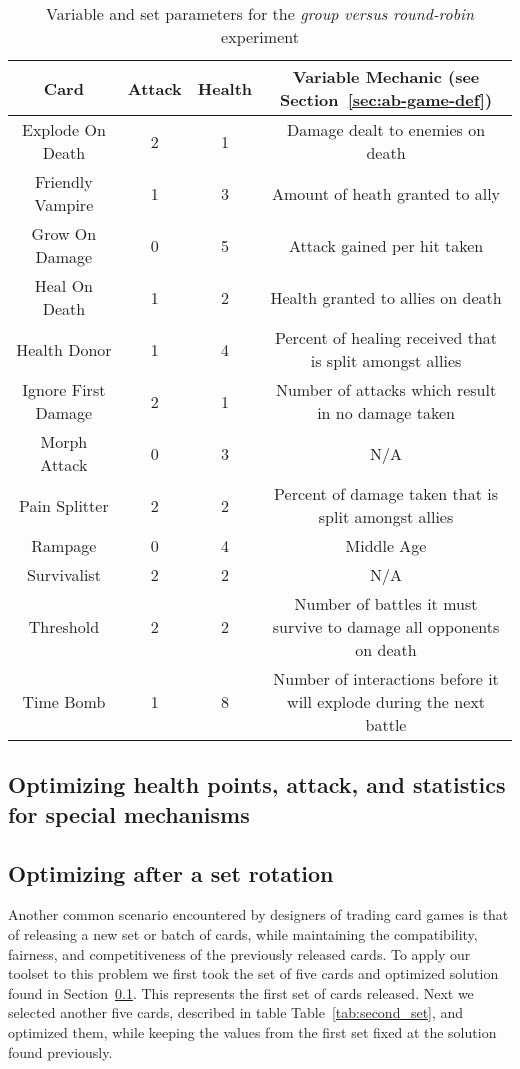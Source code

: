 \begin{table*}[t]
\centering
\begin{tabular}{||c c c c||} 
 \hline
 Card & Attack & Health & Variable Mechanic (see Section~\ref{sec:ab-game-def})\\ [0.5ex] 
 \hline\hline
 Explode On Death & 2 & 1 & Damage dealt to enemies on death \\ 
 \hline
 Friendly Vampire & 1 & 3 & Amount of heath granted to ally \\
 \hline
 Grow On Damage & 0 & 5 & Attack gained per hit taken \\
 \hline
 Heal On Death & 1 & 2 & Health granted to allies on death \\
 \hline
 Health Donor & 1 & 4 & Percent of healing received that is split amongst allies \\
 \hline
 Ignore First Damage & 2 & 1 & Number of attacks which result in no damage taken \\
 \hline
 Morph Attack & 0 & 3 & N/A \\
 \hline
 Pain Splitter & 2 & 2 & Percent of damage taken that is split amongst allies \\
 \hline
 Rampage & 0 & 4 & Middle Age  \\
 \hline
 Survivalist & 2 & 2 & N/A \\
 \hline
 Threshold & 2 & 2 & Number of battles it must survive to damage all opponents on death \\
 \hline
 Time Bomb & 1 & 8 & Number of interactions before it will explode during the next battle \\ 
 \hline
\end{tabular}
\caption{Variable and set parameters for the \textit{group versus round-robin} experiment}
\label{tab:group_vs_rr_params}
\end{table*}

\subsection{Optimizing health points, attack, and statistics for special mechanisms} \label{sec:first_set}

\subsection{Optimizing after a set rotation}

Another common scenario encountered by designers of trading card games is that of releasing a new set or batch of cards, while maintaining the compatibility, fairness, and competitiveness of the previously released cards. To apply our toolset to this problem we first took the set of five cards and optimized solution found in Section~\ref{sec:first_set}. This represents the first set of cards released. Next we selected another five cards, described in table Table~\ref{tab:second_set}, and optimized them, while keeping the values from the first set fixed at the solution found previously. 

